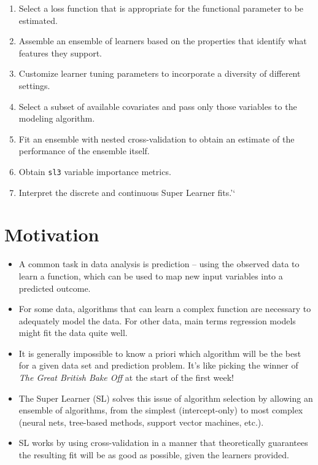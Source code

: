 \documentclass[12pt, krantz2,]{krantz}
\newcommand{\passthrough}[1]{#1}
\providecommand{\tightlist}{%
  \setlength{\itemsep}{0pt}\setlength{\parskip}{0pt}}
\theoremstyle{definition}
\theoremstyle{definition}
\theoremstyle{definition}
\newcommand{\1}{\mathbbm{1}}
\begin{document}
\begin{enumerate}
\def\labelenumi{\arabic{enumi}.}
\tightlist
\item
  Select a loss function that is appropriate for the functional parameter to
  be estimated.
\item
  Assemble an ensemble of learners based on the properties that identify what
  features they support.
\item
  Customize learner tuning parameters to incorporate a diversity of different
  settings.
\item
  Select a subset of available covariates and pass only those variables to the
  modeling algorithm.
\item
  Fit an ensemble with nested cross-validation to obtain an estimate of the
  performance of the ensemble itself.
\item
  Obtain \passthrough{\lstinline!sl3!} variable importance metrics.
\item
  Interpret the discrete and continuous Super Learner fits.'`
\end{enumerate}

\hypertarget{motivation}{%
\section*{Motivation}\label{motivation}}


\begin{itemize}
\tightlist
\item
  A common task in data analysis is prediction -- using the observed data to
  learn a function, which can be used to map new input variables into a
  predicted outcome.
\item
  For some data, algorithms that can learn a complex function are necessary to
  adequately model the data. For other data, main terms regression models might
  fit the data quite well.
\item
  It is generally impossible to know a priori which algorithm will be the best
  for a given data set and prediction problem. It's like picking the winner of
  \emph{The Great British Bake Off} at the start of the first week!
\item
  The Super Learner (SL) solves this issue of algorithm selection by allowing
  an ensemble of algorithms, from the simplest (intercept-only) to most
  complex (neural nets, tree-based methods, support vector machines, etc.).
\item
  SL works by using cross-validation in a manner that theoretically guarantees
  the resulting fit will be as good as possible, given the learners provided.
\end{itemize}
\end{document}
